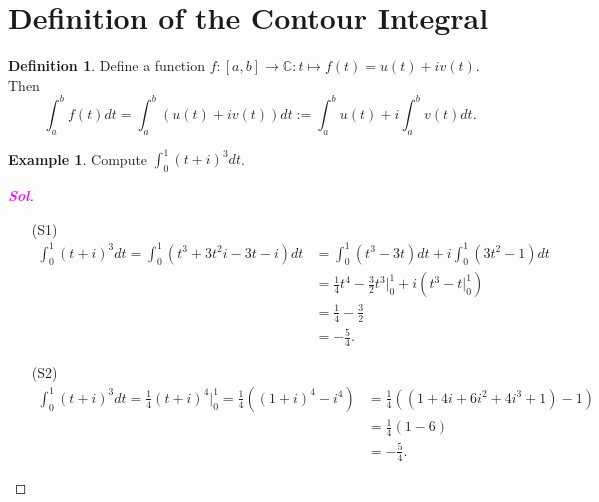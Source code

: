 \documentclass[12pt,openany]{book}
\theoremstyle{definition}
\newtheorem{definition}{Definition}[chapter]
\newtheorem{example}{Example}[section]
\newcommand{\R}{\mathbb{R}}
\newcommand{\C}{\mathbb{C}}
\newcommand{\of}[1]{\left( #1 \right)}
\newcommand{\sol}{\textcolor{magenta}{\bf Sol}}
\begin{document}
	\section{Definition of the Contour Integral}
	\begin{tcolorbox}[colback=white,colframe=defcolor,arc=5pt,title={\color{white}\bf Path Integral $\R\to\C$}]
		\begin{definition}
			Define a function $f:[a,b]\to\C:t\mapsto f\of{t}=u\of{t}+iv\of{t}$. Then \[
			\int_a^bf\of{t}dt=\int_a^b\of{u\of{t}+iv\of{t}}dt:=\int_a^bu(t)+i\int_a^bv\of{t}dt.
			\]
		\end{definition}
	\end{tcolorbox}
	\begin{example}
		Compute $\int_0^1\of{t+i}^3dt$.
		\begin{proof}[\sol]
			\begin{itemize}
				\item[(S1)] \begin{align*}
				\int_0^1\of{t+i}^3dt=\int_0^1\of{t^3+3t^2i-3t-i}dt&=\int_0^1\of{t^3-3t}dt+i\int_0^1\of{3t^2-1}dt\\
				&=\frac{1}{4}t^4-\frac{3}{2}t^3\bigg|_0^1+i\left(t^3-t\bigg|_0^1\right)\\
				&=\frac{1}{4}-\frac{3}{2}\\
				&=-\frac{5}{4}.
				\end{align*}
				\item[(S2)] \begin{align*}
				\int_0^1\of{t+i}^3dt=\frac{1}{4}\of{t+i}^4\bigg|_0^1=\frac{1}{4}\of{(1+i)^4-i^4}&=\frac{1}{4}\of{\of{1+4i+6i^2+4i^3+1}-1}\\
				&=\frac{1}{4}\of{1-6}\\
				&=-\frac{5}{4}.
				\end{align*}
			\end{itemize}
		\end{proof}
	\end{example}
	
\end{document}
